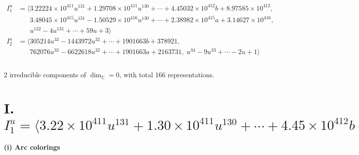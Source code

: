 \documentclass[1p]{elsarticle_modified}
\theoremstyle{definition}
\begin{document}
\begin{align*}
I^u_{1}&=\langle 
3.22224\times10^{411} u^{131}+1.29708\times10^{411} u^{130}+\cdots+4.45032\times10^{412} b+8.97585\times10^{412},\\
\phantom{I^u_{1}}&\phantom{= \langle  }3.48045\times10^{415} u^{131}-1.50529\times10^{416} u^{130}+\cdots+2.38982\times10^{415} a+3.14627\times10^{416},\\
\phantom{I^u_{1}}&\phantom{= \langle  }u^{132}-4 u^{131}+\cdots+59 u+3\rangle \\
I^u_{2}&=\langle 
305214 u^{33}-1443972 u^{32}+\cdots+1901663 b+378921,\\
\phantom{I^u_{2}}&\phantom{= \langle  }762076 u^{33}-6622618 u^{32}+\cdots+1901663 a+2163731,\;u^{34}-9 u^{33}+\cdots-2 u+1\rangle \\
\\
\end{align*}
\raggedright * 2 irreducible components of $\dim_{\mathbb{C}}=0$, with total 166 representations.\\
\newpage
\renewcommand{\arraystretch}{1}
\centering \section*{I. $I^u_{1}= \langle 3.22\times10^{411} u^{131}+1.30\times10^{411} u^{130}+\cdots+4.45\times10^{412} b+8.98\times10^{412},\;3.48\times10^{415} u^{131}-1.51\times10^{416} u^{130}+\cdots+2.39\times10^{415} a+3.15\times10^{416},\;u^{132}-4 u^{131}+\cdots+59 u+3 \rangle$}
\flushleft \textbf{(i) Arc colorings}\\
\end{document}

